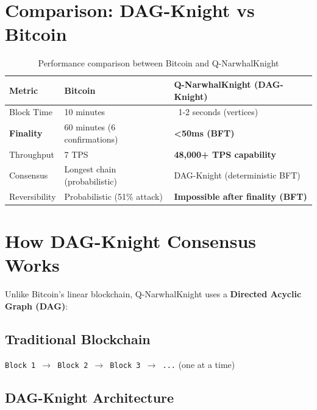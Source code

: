 \documentclass[12pt,a4paper]{article}
\begin{document}
\section{Comparison: DAG-Knight vs Bitcoin}

\begin{table}[h]
\centering
\begin{tabular}{lll}
\toprule
\textbf{Metric} & \textbf{Bitcoin} & \textbf{Q-NarwhalKnight (DAG-Knight)} \\
\midrule
Block Time & 10 minutes & ~1-2 seconds (vertices) \\
\textcolor{quantumgreen}{\textbf{Finality}} & 60 minutes (6 confirmations) & \textcolor{quantumgreen}{\textbf{<50ms (BFT)}} \\
Throughput & 7 TPS & \textbf{48,000+ TPS capability} \\
Consensus & Longest chain (probabilistic) & DAG-Knight (deterministic BFT) \\
Reversibility & Probabilistic (51\% attack) & \textbf{Impossible after finality (BFT)} \\
\bottomrule
\end{tabular}
\caption{Performance comparison between Bitcoin and Q-NarwhalKnight}
\end{table}

\section{How DAG-Knight Consensus Works}

Unlike Bitcoin's linear blockchain, Q-NarwhalKnight uses a \textbf{Directed Acyclic Graph (DAG)}:

\subsection{Traditional Blockchain}
\begin{center}
\texttt{Block 1 $\rightarrow$ Block 2 $\rightarrow$ Block 3 $\rightarrow$ ...} (one at a time)
\end{center}

\subsection{DAG-Knight Architecture}

\begin{center}
\end{center}
\end{document}
